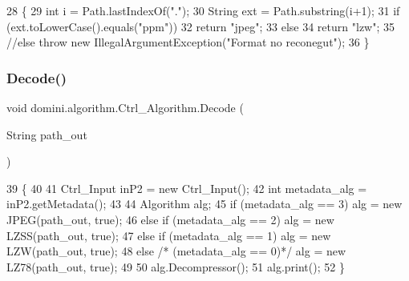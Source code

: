 \begin{DoxyCode}
28     \{
29         \textcolor{keywordtype}{int} i = Path.lastIndexOf(\textcolor{stringliteral}{"."});
30         String ext = Path.substring(i+1);
31         \textcolor{keywordflow}{if} (ext.toLowerCase().equals(\textcolor{stringliteral}{"ppm"})) 
32             \textcolor{keywordflow}{return} \textcolor{stringliteral}{"jpeg"};
33         \textcolor{keywordflow}{else}  
34             \textcolor{keywordflow}{return} \textcolor{stringliteral}{"lzw"};
35         \textcolor{comment}{//else throw new IllegalArgumentException("Format no reconegut");}
36     \}
\end{DoxyCode}
\mbox{\label{classdomini_1_1algorithm_1_1Ctrl__Algorithm_a344b213ee2eb3e0ed3306883624c5128}} 
\subsubsection{\texorpdfstring{Decode()}{Decode()}}
{\footnotesize\ttfamily void domini.\+algorithm.\+Ctrl\+\_\+\+Algorithm.\+Decode (\begin{DoxyParamCaption}\item[{String}]{path\+\_\+out }\end{DoxyParamCaption})\hspace{0.3cm}{\ttfamily [inline]}}


\begin{DoxyCode}
39                                         \{
40 
41         Ctrl\_Input inP2 = \textcolor{keyword}{new} Ctrl\_Input();
42         \textcolor{keywordtype}{int} metadata\_alg = inP2.getMetadata();
43 
44         Algorithm alg;
45         \textcolor{keywordflow}{if}      (metadata\_alg == 3)   alg = \textcolor{keyword}{new} JPEG(path\_out, \textcolor{keyword}{true});
46         \textcolor{keywordflow}{else} \textcolor{keywordflow}{if} (metadata\_alg == 2)   alg = \textcolor{keyword}{new} LZSS(path\_out, \textcolor{keyword}{true});
47         \textcolor{keywordflow}{else} \textcolor{keywordflow}{if} (metadata\_alg == 1)   alg = \textcolor{keyword}{new} LZW(path\_out, \textcolor{keyword}{true});
48         \textcolor{keywordflow}{else} \textcolor{comment}{/* (metadata\_alg == 0)*/} alg = \textcolor{keyword}{new} LZ78(path\_out, \textcolor{keyword}{true});
49         
50         alg.Decompressor();      
51         alg.print();
52     \}
\end{DoxyCode}
\mbox{\label{classdomini_1_1algorithm_1_1Ctrl__Algorithm_ac03e09b1fd22f0857bf766fc692efc33}} 
